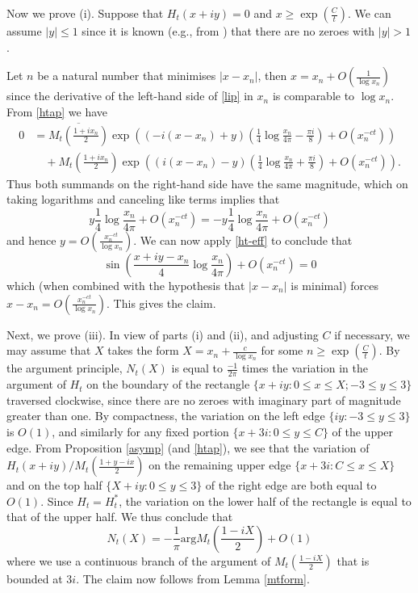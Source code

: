 Now we prove (i).
Suppose that $H_t(x+iy)=0$ and $x \geq \exp(\frac{C}{t})$.  We can assume $|y| \leq 1$ since it is known (e.g., from \cite[Theorem 13]{debr}) that there are no zeroes with $|y|>1$.  

Let $n$ be a natural number that minimises $|x-x_n|$, then $x = x_n+O\left(\frac{1}{\log x_n}\right)$ since the derivative of the left-hand side of \eqref{lip} in $x_n$ is comparable to $\log x_n$.  From \eqref{htap} we have
\begin{align*}
0 &= \overline{M_t\left(\frac{1+ix_n}{2}\right)} \exp\left( (-i(x-x_n)+y) \left(\frac{1}{4} \log \frac{x_n}{4\pi} - \frac{\pi i}{8}\right) + O( x_n^{-ct} )\right) \\
&\quad + M_t(\frac{1+ix_n}{2}) \exp\left( (i(x-x_n)-y) \left(\frac{1}{4} \log \frac{x_n}{4\pi} + \frac{\pi i}{8}\right) + O( x_n^{-ct} )\right).
\end{align*}
Thus both summands on the right-hand side have the same magnitude, which on taking logarithms and canceling like terms implies that
$$ y \frac{1}{4} \log \frac{x_n}{4\pi} + O( x_n^{-ct} ) = -y \frac{1}{4} \log \frac{x_n}{4\pi} + O( x_n^{-ct} )$$
and hence $y = O\left( \frac{x_n^{-ct}}{\log x_n} \right)$.  We can now apply \eqref{ht-eff} to conclude that
$$ \sin\left(\frac{x+iy-x_n}{4} \log \frac{x_n}{4\pi}\right) + O( x_n^{-ct} ) = 0$$
which (when combined with the hypothesis that $|x-x_n|$ is minimal) forces $x - x_n = O\left( \frac{x_n^{-ct}}{\log x_n} \right)$.  This gives the claim.

Next, we prove (iii).  In view of parts (i) and (ii), and adjusting $C$ if necessary, we may assume that $X$ takes the form $X = x_n+\frac{c}{\log x_n}$ for some $n \geq \exp( \frac{C}{t})$.  By the argument principle, $N_t(X)$ is equal to $\frac{-1}{2\pi}$ times the variation in the argument of $H_t$ on the boundary of the rectangle $\{ x+iy: 0 \leq x \leq X; -3 \leq y \leq 3 \}$ traversed clockwise, since there are no zeroes with imaginary part of magnitude greater than one.  By compactness, the variation on the left edge $\{ iy: -3 \leq y \leq 3 \}$ is $O(1)$, and similarly for any fixed portion $\{ x+3i: 0 \leq y \leq C \}$ of the upper edge.  From Proposition \ref{asymp} (and \eqref{htap}), we see that the variation of $H_t(x+iy) / M_t(\frac{1+y-ix}{2})$ on the remaining upper edge $\{ x+3i: C \leq x \leq X \}$ and on the top half $\{ X+iy: 0 \leq y \leq 3 \}$ of the right edge are both equal to $O(1)$.  Since $H_t = H_t^*$, the variation on the lower half of the rectangle is equal to that of the upper half. We thus conclude that
$$ N_t(X) = -\frac{1}{\pi} \mathrm{arg} M_t\left(\frac{1-iX}{2}\right)+ O(1)$$
where we use a continuous branch of the argument of $M_t\left(\frac{1-iX}{2}\right)$ that is bounded at $3i$.  The claim now follows from Lemma \ref{mtform}.

